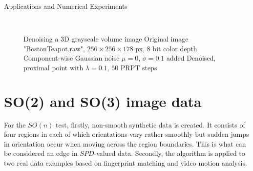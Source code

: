 \begin{chapter}{Applications and Numerical Experiments}
\begin{figure}[h!]
    \centering
    \\
    \caption[Denoising 3D Grayscale Volume Data]{Denoising a 3D grayscale volume image
	 Original image "BostonTeapot.raw", $256\times 256 \times 178$ px, 8 bit color depth
	 Component-wise Gaussian noise $\mu=0$, $\sigma=0.1$ added
	 Denoised, proximal point with $\lambda=0.1$, $50$ PRPT steps
	\label{fig:application_volume1}
    }
\end{figure}


\FloatBarrier
\section{SO(2) and SO(3) image data} %
\label{sec:SO image data}
For the $SO(n)$ test, firstly, non-smooth synthetic data is created. It consists of 
four regions in each of which orientations vary rather smoothly but sudden jumps
in orientation occur when moving across the region boundaries. This is what can be
considered an edge in $SPD$-valued data. Secondly, the algorithm is applied to two 
real data examples based on fingerprint matching and video motion analysis.


\end{chapter}
